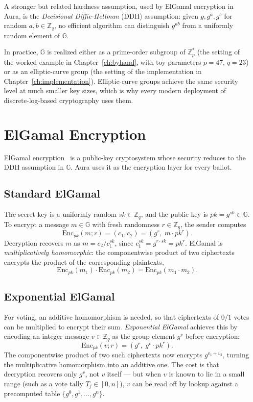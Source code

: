 \documentclass[12pt,a4paper,oneside]{report}
\begin{document}
A stronger but related hardness assumption, used by ElGamal encryption 
in Aura, is the \textit{Decisional Diffie-Hellman} (DDH) assumption: 
given $g, g^a, g^b$ for random $a, b \in \mathbb{Z}_q$, no efficient 
algorithm can distinguish $g^{ab}$ from a uniformly random element of 
$\mathbb{G}$.

In practice, $\mathbb{G}$ is realized either as a prime-order subgroup 
of $\mathbb{Z}_p^*$ (the setting of the worked example in 
Chapter~\ref{ch:byhand}, with toy parameters $p = 47$, $q = 23$) or 
as an elliptic-curve group (the setting of the implementation in 
Chapter~\ref{ch:implementation}). Elliptic-curve groups achieve the 
same security level at much smaller key sizes, which is why every 
modern deployment of discrete-log-based cryptography uses them.
\section{ElGamal Encryption}
\label{sec:elgamal}

ElGamal encryption~\cite{elgamal} is a public-key cryptosystem whose security 
reduces to the DDH assumption in $\mathbb{G}$. Aura uses it as the encryption 
layer for every ballot.

\subsection*{Standard ElGamal}
The secret key is a uniformly random $sk \in \mathbb{Z}_q$, and the public 
key is $pk = g^{sk} \in \mathbb{G}$. To encrypt a message $m \in \mathbb{G}$ 
with fresh randomness $r \in \mathbb{Z}_q$, the sender computes
\[
    \text{Enc}_{pk}(m; r) = (c_1, c_2) = (g^r,\; m \cdot pk^r).
\]
Decryption recovers $m$ as $m = c_2 / c_1^{sk}$, since 
$c_1^{sk} = g^{r \cdot sk} = pk^r$. ElGamal is \textit{multiplicatively 
homomorphic}: the componentwise product of two ciphertexts encrypts the 
product of the corresponding plaintexts,
\[
    \text{Enc}_{pk}(m_1) \cdot \text{Enc}_{pk}(m_2) = \text{Enc}_{pk}(m_1 \cdot m_2).
\]

\subsection*{Exponential ElGamal}
For voting, an additive homomorphism is needed, so that ciphertexts of $0/1$ 
votes can be multiplied to encrypt their sum. \textit{Exponential ElGamal} 
achieves this by encoding an integer message $v \in \mathbb{Z}_q$ as the 
group element $g^v$ before encryption:
\[
    \text{Enc}_{pk}(v; r) = (g^r,\; g^v \cdot pk^r).
\]
The componentwise product of two such ciphertexts now encrypts $g^{v_1 + v_2}$, 
turning the multiplicative homomorphism into an additive one. The cost is 
that decryption recovers only $g^v$, not $v$ itself --- but when $v$ is 
known to lie in a small range (such as a vote tally $T_j \in [0, n]$), $v$ 
can be read off by lookup against a precomputed table $\{g^0, g^1, \ldots, g^n\}$.
\end{document}
